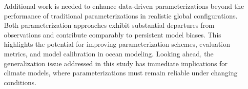 \documentclass[draft]{agujournal2019}
\begin{document}

Additional work is needed to enhance data-driven parameterizations beyond the performance of traditional parameterizations in realistic global configurations. Both parameterization approaches exhibit substantial departures from observations and contribute comparably to persistent model biases. This highlights the potential for improving parameterization schemes, evaluation metrics, and model calibration in ocean modeling. Looking ahead, the generalization issue addressed in this study has immediate implications for climate models, where parameterizations must remain reliable under changing conditions.



\end{document}
